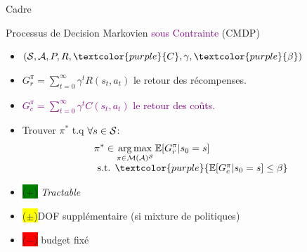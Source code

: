 \documentclass[french]{beamer}
\newcommand{\cplus}{\colorbox{green}{($+$)} }
\newcommand{\cmoins}{\colorbox{red}{($-$)} }
\newcommand{\cmean}{\colorbox{yellow}{($\pm$)}}
\begin{document}
    \begin{frame}{Cadre}

        \begin{block}{Processus de Decision Markovien \textcolor{purple}{sous Contrainte} (CMDP)}
            \begin{itemize}
                \item $(\cS, \cA, P, R,\textcolor{purple}{C}, \gamma,\textcolor{purple}{\beta})$
                \item $G_r^\pi = \sum_{t=0}^\infty \gamma^t R(s_t, a_t)$ le retour des récompenses.
                \item \textcolor{purple}{ $G_c^\pi = \sum_{t=0}^\infty \gamma^t C(s_t, a_t)$ le retour des coûts.}
                \item Trouver $\pi^*$ t.q $\forall s\in\mathcal{S}$:
                \begin{equation}
                    \label{eq:cmdp}
                    \begin{array}{lcr}
                        \displaystyle \pi^* \in \argmax_{\pi\in\cM(\cA)^\cS} \expectedvalue[G_r^\pi | s_0=s] \\
                        \text{ s.t. }  \textcolor{purple}{\expectedvalue[G_c^\pi | s_0=s] \leq \beta}
                    \end{array}
                \end{equation}
            \end{itemize}
        \end{block}

        \begin{block}{}
            \begin{itemize}
                \item \cplus \textit{Tractable}
                \item \cmean DOF supplémentaire (si mixture de politiques) %
                \item \cmoins budget fixé


            \end{itemize}
        \end{block}

    \end{frame}
\end{document}
